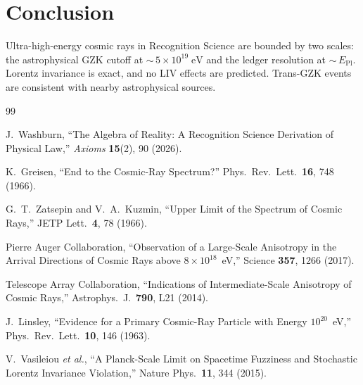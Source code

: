 \documentclass[12pt,a4paper]{article}
\theoremstyle{definition}
\theoremstyle{remark}
\begin{document}
\section{Conclusion}
\label{sec:conclusion}

Ultra-high-energy cosmic rays in Recognition Science are bounded by
two scales: the astrophysical GZK cutoff at
${\sim}\,5 \times 10^{19}\;\mathrm{eV}$ and the ledger resolution
at ${\sim}\,E_{\mathrm{Pl}}$.  Lorentz invariance is exact, and no
LIV effects are predicted.  Trans-GZK events are consistent with
nearby astrophysical sources.

\begin{thebibliography}{99}

J.~Washburn, ``The Algebra of Reality: A Recognition Science Derivation
of Physical Law,'' \emph{Axioms} \textbf{15}(2), 90 (2026).

K.~Greisen, ``End to the Cosmic-Ray Spectrum?'' Phys.\ Rev.\ Lett.\
\textbf{16}, 748 (1966).

G.~T.~Zatsepin and V.~A.~Kuzmin, ``Upper Limit of the Spectrum of
Cosmic Rays,'' JETP Lett.\ \textbf{4}, 78 (1966).

Pierre Auger Collaboration, ``Observation of a Large-Scale
Anisotropy in the Arrival Directions of Cosmic Rays above
$8 \times 10^{18}$~eV,'' Science \textbf{357}, 1266 (2017).

Telescope Array Collaboration, ``Indications of Intermediate-Scale
Anisotropy of Cosmic Rays,'' Astrophys.\ J.\ \textbf{790}, L21
(2014).

J.~Linsley, ``Evidence for a Primary Cosmic-Ray Particle with Energy
$10^{20}$~eV,'' Phys.\ Rev.\ Lett.\ \textbf{10}, 146 (1963).

V.~Vasileiou \textit{et al.}, ``A Planck-Scale Limit on
Spacetime Fuzziness and Stochastic Lorentz Invariance Violation,''
Nature Phys.\ \textbf{11}, 344 (2015).

\end{thebibliography}
\end{document}
